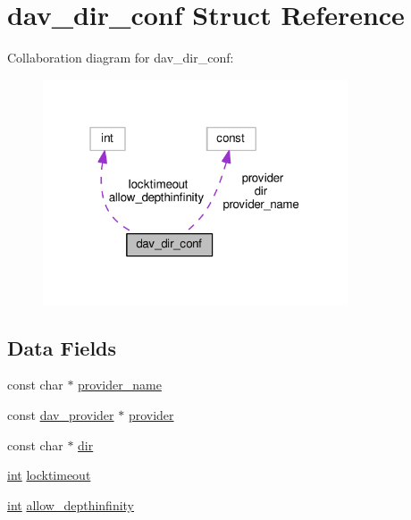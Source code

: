 \hypertarget{structdav__dir__conf}{}\section{dav\+\_\+dir\+\_\+conf Struct Reference}
\label{structdav__dir__conf}


Collaboration diagram for dav\+\_\+dir\+\_\+conf\+:
\nopagebreak
\begin{figure}[H]
\begin{center}
\leavevmode
\includegraphics[width=256pt]{structdav__dir__conf__coll__graph}
\end{center}
\end{figure}
\subsection*{Data Fields}
\begin{DoxyCompactItemize}
\item 
const char $\ast$ \hyperlink{structdav__dir__conf_ade134709846ce77682b73a2f7cf85e28}{provider\+\_\+name}
\item 
const \hyperlink{structdav__provider}{dav\+\_\+provider} $\ast$ \hyperlink{structdav__dir__conf_a49ba26c22cef2fc55c91d2230bf6188e}{provider}
\item 
const char $\ast$ \hyperlink{structdav__dir__conf_af62590540ec8481fe47d7d57a4af97e3}{dir}
\item 
\hyperlink{pcre_8txt_a42dfa4ff673c82d8efe7144098fbc198}{int} \hyperlink{structdav__dir__conf_a224f6ed6f5539cbc7ab1958d89eb519f}{locktimeout}
\item 
\hyperlink{pcre_8txt_a42dfa4ff673c82d8efe7144098fbc198}{int} \hyperlink{structdav__dir__conf_a3b8b878c56ea3d725f3d86ece37aba03}{allow\+\_\+depthinfinity}
\end{DoxyCompactItemize}


